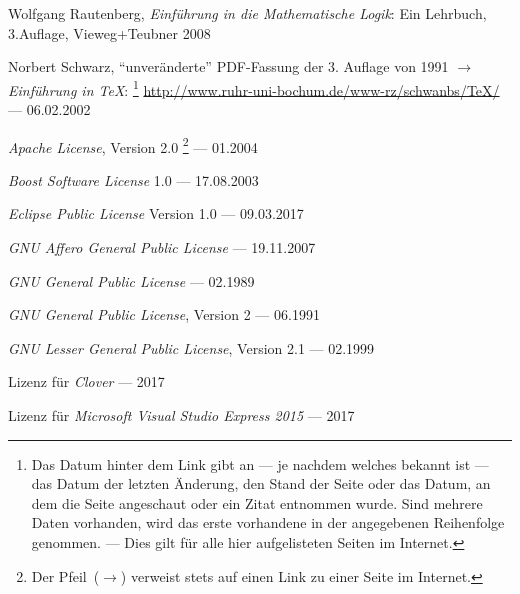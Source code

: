 \begin{flushleft}
	\begin{thebibliography}{12}
		\label{dic:Literaturverzeichnis}
		\likesection{\bibname}

		 Wolfgang Rautenberg,
		\emph{Einführung in die Mathematische Logik}:
		Ein Lehrbuch, 3.\@ Auflage, Vieweg+Teubner 2008

		 Norbert Schwarz,
		"`unveränderte"' PDF-Fassung der 3. Auflage von 1991
		$\rightarrow$%
		\emph{Einführung in \TeX}:
		\footnote{%
			Das Datum hinter dem Link gibt an --- je nachdem welches bekannt ist --- das Datum der letzten Änderung, den Stand der Seite oder das Datum, an dem die Seite angeschaut oder ein Zitat entnommen wurde.
			Sind mehrere Daten vorhanden, wird das erste vorhandene in der angegebenen Reihenfolge genommen.
			--- Dies gilt für alle hier aufgelisteten Seiten im Internet.
		}
		\url{http://www.ruhr-uni-bochum.de/www-rz/schwanbs/TeX/}
		--- 06.02.2002

		 \emph{Apache License}, Version 2.0
		\footnote{%
			Der Pfeil~($\rightarrow$) verweist stets auf einen Link zu einer Seite im Internet.
		}
		--- 01.2004%

		 \emph{Boost Software License} 1.0
		--- 17.08.2003

		 \emph{Eclipse Public License} Version 1.0
		--- 09.03.2017

		 \emph{GNU Affero General Public License}
		--- 19.11.2007

		 \emph{GNU General Public License}
		--- 02.1989

		 \emph{GNU General Public License}, Version 2
		--- 06.1991

		 \emph{GNU Lesser General Public License},
		Version 2.1
		--- 02.1999

		 Lizenz für \emph{Clover}
		--- 2017

		 Lizenz
		für \emph{Microsoft Visual Studio Express 2015}
		--- 2017


\end{thebibliography}
\end{flushleft}
